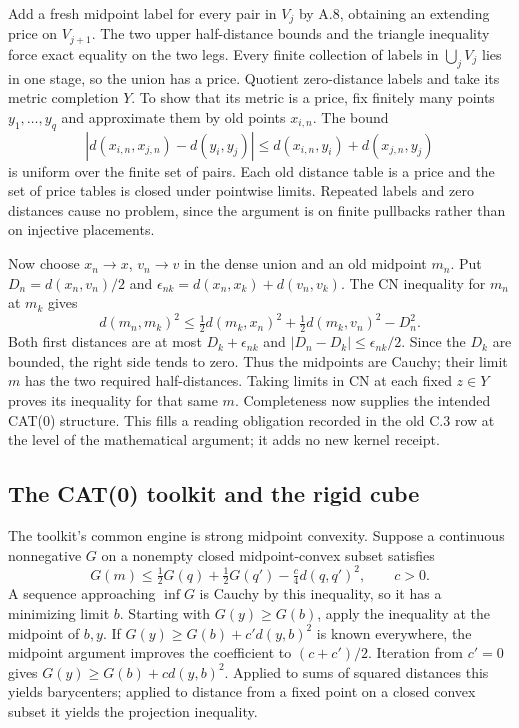 \documentclass[11pt,letterpaper]{article}
\theoremstyle{definition}\newtheorem{definition}[theorem]{Definition}\newtheorem{example}[theorem]{Example}
\theoremstyle{remark}\newtheorem{remark}[theorem]{Remark}
\begin{document}
Add a fresh midpoint label for every pair in $V_j$ by A.8, obtaining an extending price on $V_{j+1}$. The two upper half-distance bounds and the triangle inequality force exact equality on the two legs. Every finite collection of labels in $\bigcup_jV_j$ lies in one stage, so the union has a price. Quotient zero-distance labels and take its metric completion $Y$. To show that its metric is a price, fix finitely many points $y_1,\ldots,y_q$ and approximate them by old points $x_{i,n}$. The bound
\[
 |d(x_{i,n},x_{j,n})-d(y_i,y_j)|\le d(x_{i,n},y_i)+d(x_{j,n},y_j)
\]
is uniform over the finite set of pairs. Each old distance table is a price and the set of price tables is closed under pointwise limits. Repeated labels and zero distances cause no problem, since the argument is on finite pullbacks rather than on injective placements.

Now choose $x_n\to x$, $v_n\to v$ in the dense union and an old midpoint $m_n$. Put $D_n=d(x_n,v_n)/2$ and $\epsilon_{nk}=d(x_n,x_k)+d(v_n,v_k)$. The CN inequality for $m_n$ at $m_k$ gives
\[
 d(m_n,m_k)^2\le \tfrac12d(m_k,x_n)^2+\tfrac12d(m_k,v_n)^2-D_n^2.
\]
Both first distances are at most $D_k+\epsilon_{nk}$ and $|D_n-D_k|\le\epsilon_{nk}/2$. Since the $D_k$ are bounded, the right side tends to zero. Thus the midpoints are Cauchy; their limit $m$ has the two required half-distances. Taking limits in CN at each fixed $z\in Y$ proves its inequality for that same $m$. Completeness now supplies the intended CAT(0) structure. This fills a reading obligation recorded in the old C.3 row at the level of the mathematical argument; it adds no new kernel receipt.

\subsection{The CAT(0) toolkit and the rigid cube}\label{sec:toolkitdetail}
The toolkit's common engine is strong midpoint convexity. Suppose a continuous nonnegative $G$ on a nonempty closed midpoint-convex subset satisfies
\[
 G(m)\le\tfrac12G(q)+\tfrac12G(q')-\tfrac c4d(q,q')^2,\qquad c>0.
\]
A sequence approaching $\inf G$ is Cauchy by this inequality, so it has a minimizing limit $b$. Starting with $G(y)\ge G(b)$, apply the inequality at the midpoint of $b,y$. If $G(y)\ge G(b)+c'd(y,b)^2$ is known everywhere, the midpoint argument improves the coefficient to $(c+c')/2$. Iteration from $c'=0$ gives $G(y)\ge G(b)+c d(y,b)^2$. Applied to sums of squared distances this yields barycenters; applied to distance from a fixed point on a closed convex subset it yields the projection inequality.
\end{document}
